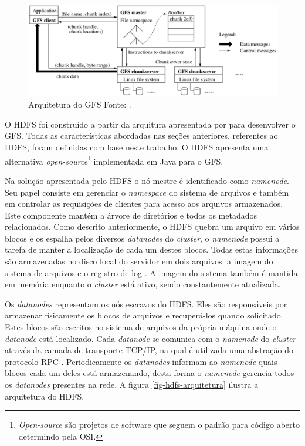 \begin{figure}[ht!]
	\centering
	\includegraphics[keepaspectratio=true,scale=0.5]
	  {figuras/gfs.eps}
	\caption[Arquitetura do GFS]{Arquitetura do GFS
	\protect\linebreak Fonte: \cite{ghemawatGfs2003}.}
	\label{fig-gfs}
\end{figure}
\FloatBarrier

O HDFS foi construído a partir da arquitura apresentada por  para desenvolver o GFS. Todas as características abordadas nas seções anteriores, referentes ao HDFS, foram definidas com base neste trabalho. O HDFS apresenta uma alternativa \textit{open-source}\footnote{\textit{Open-source} são projetos de software que seguem o padrão para código aberto determindo pela OSI.} implementada em Java para o GFS.

Na solução apresentada pelo HDFS o nó mestre é identificado como \textit{namenode}. Seu papel consiste em gerenciar o \textit{namespace} do sistema de arquivos e também em controlar as requisições de clientes para acesso aos arquivos armazenados. Este componente mantém a árvore de diretórios e todos os metadados relacionados. Como descrito anteriormente, o HDFS quebra um arquivo em vários blocos e os espalha pelos diversos \textit{datanodes} do \textit{cluster}, o \textit{namenode} possui a tarefa de manter a localização de cada um destes blocos. Todas estas informações são armazenadas no disco local do servidor em dois arquivos: a imagem do sistema de arquivos e o registro de log \cite{white2012}. A imagem do sistema também é mantida em memória enquanto o \textit{cluster} está ativo, sendo constantemente atualizada.

Os \textit{datanodes} representam os nós escravos do HDFS. Eles são responsáveis por armazenar fisicamente os blocos de arquivos e recuperá-los quando solicitado. Estes blocos são escritos no sistema de arquivos da própria máquina onde o \textit{datanode} está localizado. Cada \textit{datanode} se comunica com o \textit{namenode} do \textit{cluster} através da camada de transporte TCP/IP, na qual é utilizada uma abstração do protocolo RPC \cite{hadoopSiteHDFS}. Periodicamente os \textit{datanodes} informam ao \textit{namenode} quais blocos cada um deles está armazenando, desta forma o \textit{namenode} gerencia todos os \textit{datanodes} presentes na rede. A figura \ref{fig-hdfs-arquitetura} ilustra a arquitetura do HDFS.

